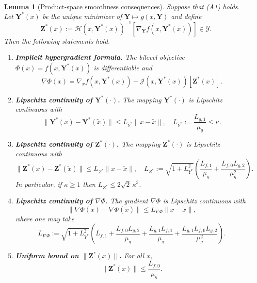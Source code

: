 \documentclass{pkumelon}
\theoremstyle{plain}
\newtheorem{lemma}{Lemma}
\newcommand{\Phiobj}{\Phi}
\begin{document}
\begin{lemma}[Product-space smoothness consequences]\label{lem:smoothness_consequences}
Suppose that \emph{(A1)} holds. Let $\boldsymbol Y^*(x)$ be the unique minimizer of $\boldsymbol Y\mapsto g(x,\boldsymbol Y)$ and define
\begin{equation}\label{eq:def_Zstar}
\boldsymbol Z^*(x):=\mathcal H(x,\boldsymbol Y^*(x))^{-1}[\nabla_{\boldsymbol Y}f(x,\boldsymbol Y^*(x))]\in\mathcal Y.
\end{equation}
Then the following statements hold.
\begin{enumerate}
\item \textbf{Implicit hypergradient formula.}
The bilevel objective $\Phiobj(x)=f(x,\boldsymbol Y^*(x))$ is differentiable and
\begin{equation}\label{eq:hypergrad_formula}
\nabla\Phiobj(x)=\nabla_x f(x,\boldsymbol Y^*(x))-\mathcal J(x,\boldsymbol Y^*(x))[\boldsymbol Z^*(x)].
\end{equation}

\item \textbf{Lipschitz continuity of $\boldsymbol Y^*(\cdot)$.}
The mapping $\boldsymbol Y^*(\cdot)$ is Lipschitz continuous with
\begin{equation}\label{eq:LY_star}
\|\boldsymbol Y^*(x)-\boldsymbol Y^*(\tilde x)\|\le L_{Y^*}\|x-\tilde x\|,
\quad
L_{Y^*}:=\frac{L_{g,1}}{\mu_g}\le \kappa.
\end{equation}

\item \textbf{Lipschitz continuity of $\boldsymbol Z^*(\cdot)$.}
The mapping $\boldsymbol Z^*(\cdot)$ is Lipschitz continuous with
\begin{equation}\label{eq:LZ_star}
\|\boldsymbol Z^*(x)-\boldsymbol Z^*(\tilde x)\|
\le L_{Z^*}\|x-\tilde x\|,
\quad
L_{Z^*}:=\sqrt{1+L_{Y^*}^2}\left(\frac{L_{f,1}}{\mu_g}+\frac{L_{f,0}L_{g,2}}{\mu_g^2}\right).
\end{equation}
In particular, if $\kappa\ge 1$ then $L_{Z^*}\le 2\sqrt{2}\,\kappa^3$.

\item \textbf{Lipschitz continuity of $\nabla\Phiobj$.}
The gradient $\nabla\Phiobj$ is Lipschitz continuous with
\begin{equation}\label{eq:Lnabla_Phi}
\|\nabla\Phiobj(x)-\nabla\Phiobj(\tilde x)\|
\le L_{\nabla\Phi}\|x-\tilde x\|,
\end{equation}
where one may take
\begin{equation}\label{eq:Lnabla_Phi_expr}
L_{\nabla\Phi}:=
\sqrt{1+L_{Y^*}^2}\left(
L_{f,1}+\frac{L_{f,0}L_{g,2}}{\mu_g}
+\frac{L_{g,1}L_{f,1}}{\mu_g}
+\frac{L_{g,1}L_{f,0}L_{g,2}}{\mu_g^2}
\right).
\end{equation}

\item \textbf{Uniform bound on $\|\boldsymbol Z^*(x)\|$.}
For all $x$,
\begin{equation}\label{eq:Zstar_bound}
\|\boldsymbol Z^*(x)\|\le \frac{L_{f,0}}{\mu_g}.
\end{equation}
\end{enumerate}
\end{lemma}
\end{document}

